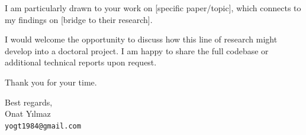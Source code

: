 \documentclass[11pt,a4paper]{article}
\begin{document}
\medskip

I am particularly drawn to your work on [specific paper/topic], which connects to my findings on [bridge to their research].

\medskip

I would welcome the opportunity to discuss how this line of research might develop into a doctoral project. I am happy to share the full codebase or additional technical reports upon request.

\medskip

\noindent Thank you for your time.

\medskip

\noindent Best regards,\\
Onat Y{\i}lmaz\\
\texttt{yogt1984@gmail.com}
\end{document}
